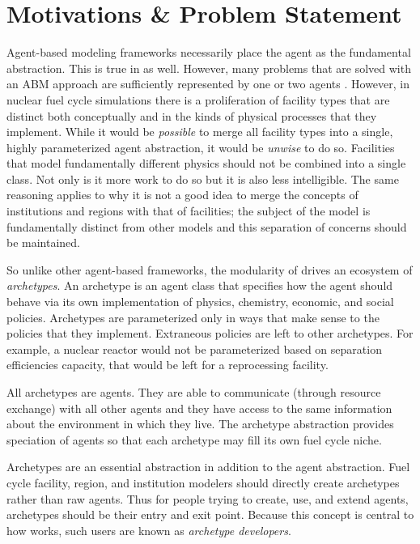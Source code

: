\section{Motivations \& Problem Statement}
\label{sec-motive}

Agent-based modeling frameworks necessarily place the agent as the fundamental 
abstraction. This is true in \cyclus as well. However, many problems that are 
solved with an \gls{ABM} approach are sufficiently represented by one or two 
agents \citeme. However, in nuclear fuel cycle simulations there is
a proliferation of facility types that are distinct both conceptually and in the 
kinds of physical processes that they implement. While it would be \emph{possible}
to merge all facility types into a single, highly parameterized agent abstraction,
it would be \emph{unwise} to do so. Facilities that model fundamentally different
physics should not be combined into a single class. Not only is it more work to 
do so but it is also less intelligible. The same reasoning applies to why it is 
not a good idea to merge the concepts of institutions and regions with that of
facilities; the subject of the model is fundamentally distinct from other models
and this separation of concerns should be maintained.

So unlike other agent-based frameworks, the modularity of \cyclus drives 
an ecosystem of \emph{archetypes}. An archetype is an agent class that specifies 
how the agent should behave via its own implementation of physics, chemistry, 
economic, and social policies. Archetypes are parameterized only in ways that 
make sense to the policies that they implement. Extraneous policies are left to 
other archetypes. For example, a nuclear reactor would not be parameterized based 
on separation efficiencies capacity, that would be left for a reprocessing facility.

All archetypes are agents. They are able to communicate (through resource 
exchange) with all other agents and they have access to the same information 
about the environment in which they live. The archetype abstraction provides
speciation of agents so that each archetype may fill its own fuel cycle niche.

Archetypes are an essential abstraction in addition to the agent abstraction. 
Fuel cycle facility, region, and institution modelers should directly create
archetypes rather than raw agents. Thus for people trying to create, use, and 
extend \cyclus agents, archetypes should be their entry and exit point. Because this 
concept is central to how \cyclus works, such users are known as \emph{archetype
developers}.

